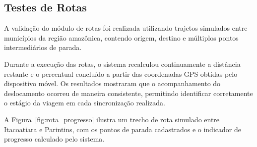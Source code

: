 \documentclass[12pt]{article}
\begin{document}
\subsection{Testes de Rotas}
A validação do módulo de rotas foi realizada utilizando trajetos simulados entre municípios da região amazônica, contendo origem, destino e múltiplos pontos intermediários de parada.

Durante a execução das rotas, o sistema recalculou continuamente a distância restante e o percentual concluído a partir das coordenadas GPS obtidas pelo dispositivo móvel. Os resultados mostraram que o acompanhamento do deslocamento ocorreu de maneira consistente, permitindo identificar corretamente o estágio da viagem em cada sincronização realizada.

A Figura~\ref{fig:rota_progresso} ilustra um trecho de rota simulado entre Itacoatiara e Parintins, com os pontos de parada cadastrados e o indicador de progresso calculado pelo sistema.
\end{document}
